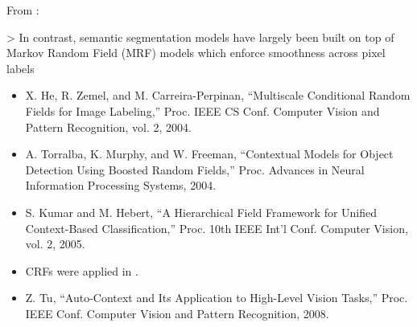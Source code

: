 










From \cite{yang2012layered}:

> In contrast, semantic segmentation models have largely been built on top of
Markov Random Field (MRF) models which enforce smoothness across pixel labels

\begin{itemize}
    \item X. He, R. Zemel, and M. Carreira-Perpinan, “Multiscale Conditional
          Random Fields for Image Labeling,” Proc. IEEE CS Conf. Computer
          Vision and Pattern Recognition, vol. 2, 2004.
    \item A. Torralba, K. Murphy, and W. Freeman, “Contextual Models for
          Object Detection Using Boosted Random Fields,” Proc. Advances in
          Neural Information Processing Systems, 2004.
    \item S. Kumar and M. Hebert, “A Hierarchical Field Framework for
          Unified Context-Based Classification,” Proc. 10th IEEE Int’l Conf.
          Computer Vision, vol. 2, 2005.
    \item \Glspl{CRF} were applied in \cite{shotton2006textonboost}.
    \item Z. Tu, “Auto-Context and Its Application to High-Level Vision
          Tasks,” Proc. IEEE Conf. Computer Vision and Pattern Recognition,
          2008.
\end{itemize}


